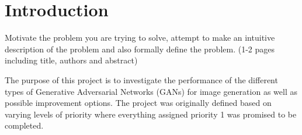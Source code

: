 \section{Introduction}

Motivate the problem you are trying to solve, attempt to make an intuitive description of the problem and also formally define the problem. (1-2 pages including title, authors and abstract)


 


The purpose of this project is to investigate the performance of the different types of Generative Adversarial Networks (GANs) \cite{goodfellow2014generative} for image generation as well as possible improvement options.
The project was originally defined based on varying levels of priority where everything assigned priority 1 was promised to be completed.

